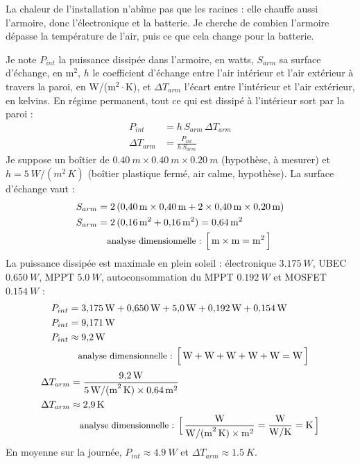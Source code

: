 La chaleur de l'installation n'abîme pas que les racines : elle chauffe aussi l'armoire, donc l'électronique et la batterie. Je cherche de combien l'armoire dépasse la température de l'air, puis ce que cela change pour la batterie.

\begin{demonstration}
Je note $P_{int}$ la puissance dissipée dans l'armoire, en watts, $S_{arm}$ sa surface d'échange, en m$^2$, $h$ le coefficient d'échange entre l'air intérieur et l'air extérieur à travers la paroi, en W/(m$^2\cdot$K), et $\Delta T_{arm}$ l'écart entre l'intérieur et l'air extérieur, en kelvins. En régime permanent, tout ce qui est dissipé à l'intérieur sort par la paroi :
\begin{align*}
P_{int} &= h\,S_{arm}\,\Delta T_{arm}\\
\Delta T_{arm} &= \frac{P_{int}}{h\,S_{arm}}
\end{align*}
Je suppose un boîtier de $\qty{0,40}{m} \times \qty{0,40}{m} \times \qty{0,20}{m}$ (hypothèse, à mesurer) et $h = \qty{5}{W/(m^2\,K)}$ (boîtier plastique fermé, air calme, hypothèse). La surface d'échange vaut :
\begin{align*}
S_{arm} &= 2\,(\qty{0,40}{m} \times \qty{0,40}{m} + 2 \times \qty{0,40}{m} \times \qty{0,20}{m})\\
S_{arm} &= 2\,(\qty{0,16}{m^2} + \qty{0,16}{m^2}) = \qty{0,64}{m^2}\\
\dimline{\unit{m}\times\unit{m}=\unit{m^2}}
\end{align*}
La puissance dissipée est maximale en plein soleil : électronique $\qty{3,175}{W}$, UBEC $\qty{0,650}{W}$, MPPT $\qty{5,0}{W}$, autoconsommation du MPPT $\qty{0,192}{W}$ et MOSFET $\qty{0,154}{W}$ :
\begin{align*}
P_{int} &= \qty{3,175}{W} + \qty{0,650}{W} + \qty{5,0}{W} + \qty{0,192}{W} + \qty{0,154}{W}\\
P_{int} &= \qty{9,171}{W}\\
P_{int} &\approx \qty{9,2}{W}\\
\dimline{\unit{W}+\unit{W}+\unit{W}+\unit{W}+\unit{W}=\unit{W}}
\end{align*}
\begin{align*}
\Delta T_{arm} &= \frac{\qty{9,2}{W}}{\qty{5}{W/(m^2\,K)} \times \qty{0,64}{m^2}}\\
\Delta T_{arm} &\approx \qty{2,9}{K}\\
\dimline{\dfrac{\unit{W}}{\unit{W/(m^2\,K)}\times\unit{m^2}}=\dfrac{\unit{W}}{\unit{W/K}}=\unit{K}}
\end{align*}
En moyenne sur la journée, $P_{int} \approx \qty{4,9}{W}$ et $\Delta T_{arm} \approx \qty{1,5}{K}$.
\end{demonstration}

